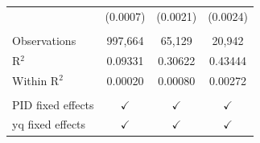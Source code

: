 \begin{tabular}{lccc}
                        & (0.0007)              & (0.0021)      & (0.0024)\\   
    \\
   Observations         & 997,664               & 65,129        & 20,942\\  
   R$^2$                & 0.09331               & 0.30622       & 0.43444\\  
   Within R$^2$         & 0.00020               & 0.00080       & 0.00272\\  
    \\
   PID fixed effects    & $\checkmark$          & $\checkmark$  & $\checkmark$\\   
   yq fixed effects     & $\checkmark$          & $\checkmark$  & $\checkmark$\\   
   \bottomrule
\end{tabular}
\par\endgroup


